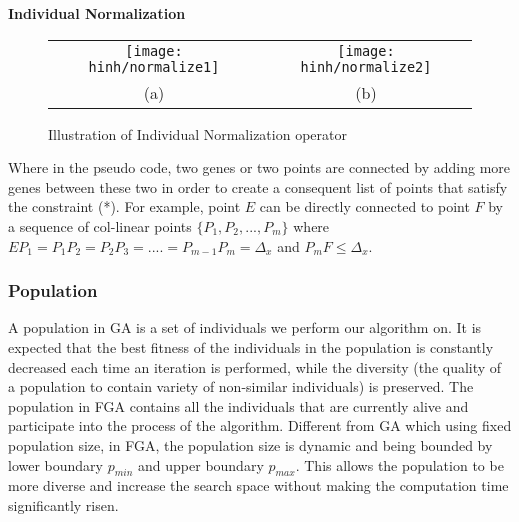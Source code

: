 \documentclass[final]{elsarticle}
\begin{document}
\begin{algorithm}[H]
	\SetAlgoLined
		\caption{\textbf{Individual Normalization}} 
		\label{alg.0}
\end{algorithm} 
\begin{figure*}[h]
	\begin{tabular}{cc}
		\texttt{[image: hinh/normalize1]}&\texttt{[image: hinh/normalize2]}\\
		(a) &(b)\\
	\end{tabular}
	\centering
	\caption{Illustration of Individual Normalization operator
	}
	\label{Fig.6}       %
\end{figure*}

Where in the pseudo code, two genes or two points are connected by adding more genes between these two in order to create a consequent list of points that satisfy the constraint (*). For example, point $ E $ can be directly connected to point $ F $ by a sequence of col-linear points $\{P_1,P_2,...,P_m\}$ where $EP_1=P_1P_2=P_2P_3=....=P_{m-1}P_m=\Delta_x$ and $P_mF \leq \Delta_x$.\\

\subsubsection{Population}

A population in GA is a set of individuals we perform our algorithm on. It is expected that the best fitness of the individuals in the population is constantly decreased each time an iteration is performed, while the diversity (the quality of a population to contain variety of non-similar individuals) is preserved. The population in FGA contains all the individuals that are currently alive and participate into the process of the algorithm. Different from GA which using fixed population size, in FGA, the population size is dynamic and being bounded by lower boundary $p_{min}$ and upper boundary $p_{max}$. This allows the population to be more diverse and increase the search space without making the computation time significantly risen.
\end{document}
